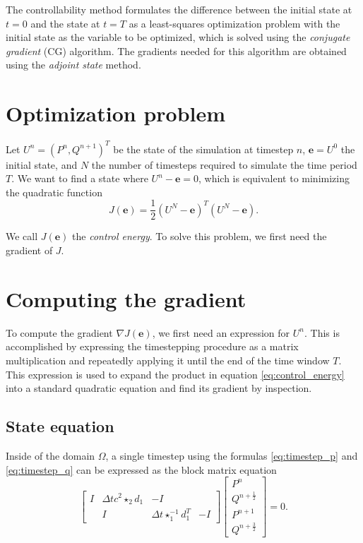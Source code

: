 \documentclass[utf8,english]{gradu3}
\begin{document}
The controllability method formulates the difference between 
the initial state at $t=0$ and the state at $t=T$
as a least-squares optimization problem
with the initial state as the variable to be optimized,
which is solved using the \textit{conjugate gradient} (CG) algorithm.
The gradients needed for this algorithm are obtained
using the \textit{adjoint state} method.


\section{Optimization problem}

Let $U^n = (P^n, Q^{n+1})^T$ be the state of the simulation at timestep $n$,
$\mathbf{e} = U^0$ the initial state, and $N$ the number of timesteps
required to simulate the time period $T$.
We want to find a state where $U^n - \mathbf{e} = 0$,
which is equivalent to minimizing the quadratic function
\begin{equation}\label{eq:control_energy}
  J(\mathbf{e}) = \frac{1}{2}(U^N - \mathbf{e})^T (U^N - \mathbf{e}).
\end{equation}

We call $J(\mathbf{e})$ the \textit{control energy}.
To solve this problem, we first need the gradient of $J$.


\section{Computing the gradient}

To compute the gradient $\nabla J(\mathbf{e})$,
we first need an expression for $U^n$.
This is accomplished by expressing the timestepping procedure
as a matrix multiplication and repeatedly applying it
until the end of the time window $T$.
This expression is used to expand the product in equation \eqref{eq:control_energy}
into a standard quadratic equation and find its gradient by inspection.


\subsection{State equation}

Inside of the domain $\Omega$, a single timestep
using the formulas \eqref{eq:timestep_p} and \eqref{eq:timestep_q}
can be expressed as the block matrix equation
\[
  \begin{bmatrix}
  I & \Delta t c^2 \star_2 d_1 & -I \\
  & I & \Delta t \star_1^{-1} d_1^T & -I
  \end{bmatrix}
  \begin{bmatrix}
  P^n \\ Q^{n+\frac{1}{2}} \\ P^{n+1} \\ Q^{n+\frac{3}{2}}
  \end{bmatrix}
  = 0.
\]
\end{document}
